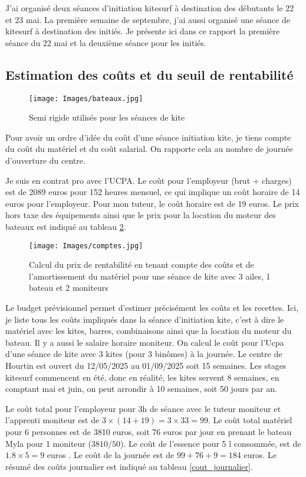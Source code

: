 \documentclass[11pt,a4paper]{report}
\begin{document}
J'ai organisé deux séances d'initiation kitesurf à destination des
débutants le 22 et 23 mai. La première semaine de septembre, j'ai 
aussi organisé une séance de kitesurf à destination des initiés.
Je présente ici dans ce rapport la première séance du 22 mai et la
deuxième séance pour les initiés.

\subsection{Estimation des co\^uts et du seuil de rentabilité}

\begin{figure}
\centering
\texttt{[image: Images/bateaux.jpg]} 
\caption{Semi rigide utilisés pour les séances de kite\label{bateaux}}
\end{figure}
Pour avoir un ordre d'idée du coût d'une séance initiation kite, je
tiens compte du co\^ut du matériel et du co\^ut salarial. On rapporte 
cela au nombre de journée d'ouverture du centre.

Je suis en contrat pro avec l'UCPA. Le coût pour l'employeur (brut + charges) est
de 2089 euros pour 152 heures mensuel, 
ce qui implique un coût horaire de 14 euros pour l'employeur.
Pour mon tuteur, le coût horaire est de 19 euros.
Le prix hors taxe des équipements ainsi
que le prix pour la location du moteur des bateaux est indiqué
au tableau \ref{couts}.

\begin{figure}
\texttt{[image: Images/comptes.jpg]} 
\caption{Calcul du prix de rentabilité en tenant compte
des co\^uts et de l'amortissement du matériel pour une séance de kite
avec 3 ailes, 1 bateau et 2 moniteurs\label{couts}}
\end{figure}

Le budget prévisionnel permet d'estimer précisément les co\^uts et les recettes.
Ici, je liste tous les coûts impliqués dans la séance d’initiation kite, 
c'est  à dire le matériel avec les kites, barres, combinaisons ainsi que
la location du moteur du bateau. Il y a aussi le salaire horaire moniteur. 
On calcul le coût pour l'Ucpa
d'une séance de kite avec 3 kites (pour 3 binômes) à la journée.
Le centre de Hourtin est ouvert du 12/05/2025 au 01/09/2025 soit 15 semaines. 
Les stages kitesurf commencent en été, donc en réalité, les kites servent
8 semaines, en comptant mai et juin, on peut arrondir à 10 semaines, soit 50 jours
par an.

Le coût total pour l'employeur pour 3h de séance avec le tuteur moniteur
et l'apprenti moniteur est de $3\times(14+19) = 3\times33 = 99 $.
Le coût total matériel pour 6 personnes est de 3810 euros, soit 76 euros
par jour  en prenant le bateau Myla pour 1 moniteur ($3810/50$).
Le coût de l'essence pour 5 l consommée, est de $1.8\times5 = 9$ euros .
Le coût de la journée est de $99 + 76 + 9 =  184 $ euros.
Le résumé des coûts journalier est indiqué au tableau \ref{cout_journalier}.
\end{document}

